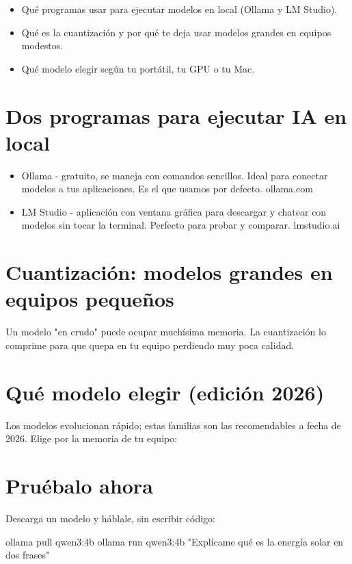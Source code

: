 \documentclass[11pt,a4paper]{book}
\begin{document}
\begin{itemize}\item Qué programas usar para ejecutar modelos en local (Ollama y LM Studio).\end{itemize}
\begin{itemize}\item Qué es la cuantización y por qué te deja usar modelos grandes en equipos modestos.\end{itemize}
\begin{itemize}\item Qué modelo elegir según tu portátil, tu GPU o tu Mac.\end{itemize}
\section{Dos programas para ejecutar IA en local}
\begin{itemize}\item Ollama - gratuito, se maneja con comandos sencillos. Ideal para conectar modelos a tus aplicaciones. Es el que usamos por defecto. ollama.com\end{itemize}
\begin{itemize}\item LM Studio - aplicación con ventana gráfica para descargar y chatear con modelos sin tocar la terminal. Perfecto para probar y comparar. lmstudio.ai\end{itemize}
\section{Cuantización: modelos grandes en equipos pequeños}
Un modelo "en crudo" puede ocupar muchísima memoria. La cuantización lo comprime para que quepa en tu equipo perdiendo muy poca calidad.

\section{Qué modelo elegir (edición 2026)}
Los modelos evolucionan rápido; estas familias son las recomendables a fecha de 2026. Elige por la memoria de tu equipo:

\section{Pruébalo ahora}
Descarga un modelo y háblale, sin escribir código:

\begin{codebox}
ollama pull qwen3:4b
ollama run qwen3:4b "Explícame qué es la energía solar en dos frases"
\end{codebox}
\end{document}
